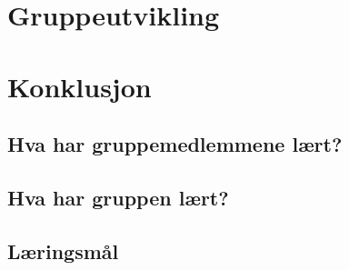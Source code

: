 \documentclass[DIV=calc, paper=a4, fontsize=12pt]{scrartcl}	 %
\begin{document}



\section{Gruppeutvikling}







%




\section{Konklusjon}


\subsection{Hva har gruppemedlemmene lært?}



\subsection{Hva har gruppen lært?}

\subsection{Læringsmål}




\onecolumn
\small{

}


\pagebreak


\end{document}
